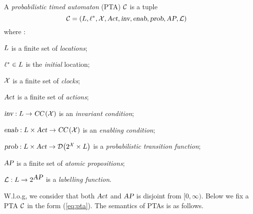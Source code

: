 \vspace{-0.6em}
\begin{definition}
A \emph{probabilistic timed automaton} (PTA) $\mathcal{C}$ is a tuple
\begin{equation}\label{eq:pta}
\mathcal{C}=\left(L, \ell^*, \mathcal{X}, \mbox{\sl Act}, \mbox{\sl inv}, \mbox{\sl enab},  \mbox{\sl prob}, \mbox{\sl AP}, \mathcal{L}\right)
\end{equation}
where :
\begin{compactitem}
\item $L$ is a finite set of \emph{locations};
\item $\ell^*\in L$ is the \emph{initial} location;
\item $\mathcal{X}$ is a finite set of \emph{clocks};
\item $\mbox{\sl Act}$ is a finite set of \emph{actions};
\item $\mbox{\sl inv}:L\rightarrow\mbox{\sl CC}\left(\mathcal{X}\right)$ is
an \emph{invariant condition};
\item $\mbox{\sl enab}:L\times\mbox{\sl Act}\rightarrow\mbox{\sl CC}\left(\mathcal{X}\right)$ is an \emph{enabling condition};
\item $\mbox{\sl prob}:L\times\mbox{\sl Act}\rightarrow{\mathcal{D}}{\left(2^{\mathcal{X}}\times L\right)}$ is a \emph{probabilistic transition function};
\item $\mbox{\sl AP}$ is a finite set of \emph{atomic propositions};
\item $\mathcal{L}:L\rightarrow 2^{\mbox{\sl AP}}$ is a \emph{labelling function}.
\end{compactitem}
\end{definition}
%
W.l.o.g, we consider that both $\mbox{\sl Act}$ and $\mbox{\sl AP}$ is disjoint from $[0,\infty)$. Below we fix a PTA $\mathcal{C}$ in the form (\ref{eq:pta}). The semantics of PTAs is as follows.

